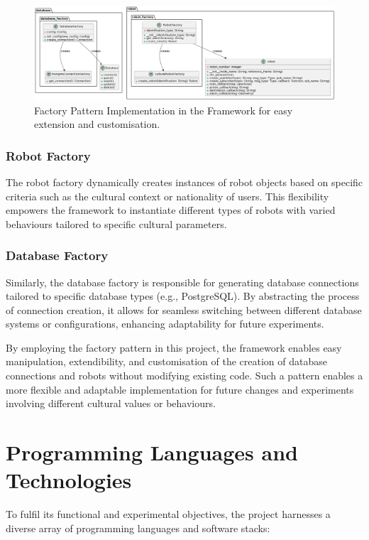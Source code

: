 \begin{figure}
   \noindent\includegraphics[width=\linewidth]{Chapter6/factory.png}  
   \caption{Factory Pattern Implementation in the Framework for easy extension and customisation.}
  \label{fig:figure2}
\end{figure}

\subsubsection{Robot Factory}

The robot factory dynamically creates instances of robot objects based on specific criteria such as the cultural context or nationality of users. This flexibility empowers the framework to instantiate different types of robots with varied behaviours tailored to specific cultural parameters.

\subsubsection{Database Factory}

Similarly, the database factory is responsible for generating database connections tailored to specific database types (e.g., PostgreSQL). By abstracting the process of connection creation, it allows for seamless switching between different database systems or configurations, enhancing adaptability for future experiments.

By employing the factory pattern in this project, the framework enables easy manipulation, extendibility, and customisation of the creation of database connections and robots without modifying existing code. Such a pattern enables a more flexible and adaptable implementation for future changes and experiments involving different cultural values or behaviours.

\section{Programming Languages and Technologies}

To fulfil its functional and experimental objectives, the project harnesses a diverse array of programming languages and software stacks:

